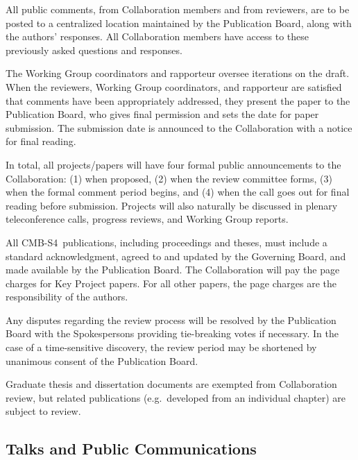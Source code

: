 \documentclass[12pt]{article}
\newcommand\collabname{CMB-S4}
\begin{document}
All public comments, from Collaboration members and from reviewers, are to be posted to a centralized location maintained by the Publication Board, along with the authors' responses.  All Collaboration members have access to these previously asked questions and responses.

The Working Group coordinators and rapporteur oversee iterations on the draft.  When the reviewers, Working Group coordinators, and rapporteur are satisfied that comments have been appropriately addressed, they present the paper to the Publication Board, who gives final permission and sets the date for paper submission.  The submission date is announced to the Collaboration with a notice for final reading.  

In total, all projects/papers will have four formal public announcements to the Collaboration: (1) when proposed, (2) when the review committee forms, (3) when the formal comment period begins, and (4) when the call goes out for final reading before submission. Projects will also naturally be discussed in plenary teleconference calls, progress reviews, and Working Group reports.

All \collabname\ publications, including proceedings and theses, must include a standard acknowledgment, agreed to and updated by the Governing Board, and made available by the Publication Board.  The Collaboration will pay the page charges for Key Project papers. For all other papers, the page charges are the responsibility of the authors.

Any disputes regarding the review process will be resolved by the Publication Board with the Spokespersons providing tie-breaking votes if necessary. In the case of a time-sensitive discovery, the review period may be shortened by unanimous consent of the Publication Board.

Graduate thesis and dissertation documents are exempted from Collaboration review, but related publications (e.g.~developed from an individual chapter) are subject to review.

\subsection{Talks and Public Communications}
\end{document}
